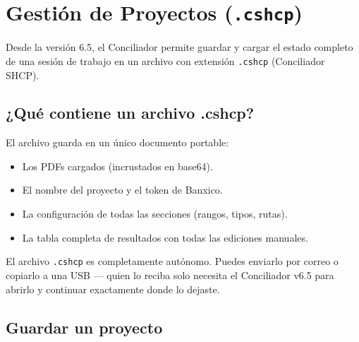 \documentclass[12pt, a4paper, oneside]{report}
\newcommand{\btn}[1]{\texttt{\colorbox{vino!15}{\strut#1}}}
\begin{document}
\chapter{Gestión de Proyectos (\texttt{.cshcp})}
\label{ch:proyectos}

Desde la versión 6.5, el Conciliador permite guardar y cargar el estado
completo de una sesión de trabajo en un archivo con extensión \texttt{.cshcp}
(Conciliador SHCP).

\section{¿Qué contiene un archivo .cshcp?}

El archivo guarda en un único documento portable:

\begin{itemize}
  \item Los PDFs cargados (incrustados en base64).
  \item El nombre del proyecto y el token de Banxico.
  \item La configuración de todas las secciones (rangos, tipos, rutas).
  \item La tabla completa de resultados con todas las ediciones manuales.
\end{itemize}

\begin{notabox}
El archivo \texttt{.cshcp} es completamente autónomo. Puedes enviarlo por
correo o copiarlo a una USB — quien lo reciba solo necesita el Conciliador
v6.5 para abrirlo y continuar exactamente donde lo dejaste.
\end{notabox}

\section{Guardar un proyecto}

\end{document}

